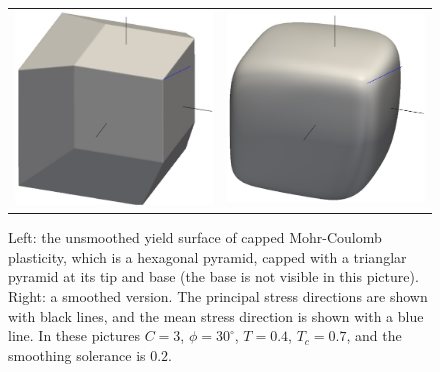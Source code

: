 \documentclass[]{scrreprt}
\begin{document}
\begin{figure}[htb]
  \begin{center}
    \begin{tabular}{ll}
\includegraphics[width=6cm]{capped_mc_3D_unsmoothed.eps} &
\includegraphics[width=6cm]{capped_mc_3D_smoothed.eps}
    \end{tabular}
\caption{Left: the unsmoothed yield surface of capped Mohr-Coulomb
  plasticity, which is a hexagonal pyramid, capped with a trianglar
  pyramid at its tip and base (the base is not visible in this
  picture).  Right: a smoothed version.  The principal stress
  directions are shown with black lines, and the mean stress direction
  is shown with a blue line.  In these pictures $C=3$,
  $\phi=30^{\circ}$, $T=0.4$, $T_{c}=0.7$, and the smoothing solerance
  is $0.2$.}
\label{cmc_3D.fig}
\end{center}
\end{figure}
\end{document}
